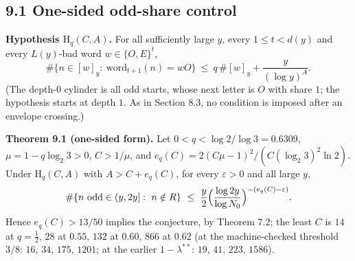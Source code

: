 \documentclass[11pt,a4paper]{article}
\begin{document}
\subsection{9.1 One-sided odd-share
control}\label{one-sided-odd-share-control}

\textbf{Hypothesis \(\mathrm H_q(C,A)\).} For all sufficiently large
\(y\), every \(1\le t<d(y)\) and every \(L(y)\)-bad word
\(w\in\{O,E\}^t\), \[
\#\{n\in[w]_y:\ \mathrm{word}_{t+1}(n)=wO\}\ \le\ q\,\#[w]_y+\frac{y}{(\log y)^{A}} .
\] (The depth-\(0\) cylinder is all odd starts, whose next letter is
\(O\) with share \(1\); the hypothesis starts at depth \(1\). As in
Section 8.3, no condition is imposed after an envelope crossing.)

\textbf{Theorem 9.1 (one-sided form).} Let \(0<q<\log 2/\log 3=0.6309\),
\(\mu=1-q\log_2 3>0\), \(C>1/\mu\), and
\(e_q(C)=2(C\mu-1)^2/(C(\log_2 3)^2\ln 2)\). Under \(\mathrm H_q(C,A)\)
with \(A>C+e_q(C)\), for every \(\varepsilon>0\) and all large \(y\), \[
\#\{n\ \text{odd}\in(y,2y]:\ n\notin R\}\ \le\ \frac y2\Bigl(\frac{\log 2y}{\log N_0}\Bigr)^{-(e_q(C)-\varepsilon)} .
\] Hence \(e_q(C)>13/50\) implies the conjecture, by Theorem 7.2; the
least \(C\) is \(14\) at \(q=\tfrac12\), \(28\) at \(0.55\), \(132\) at
\(0.60\), \(866\) at \(0.62\) (at the machine-checked threshold \(3/8\):
\(16\), \(34\), \(175\), \(1201\); at the earlier \(1-\lambda^{**}\):
\(19\), \(41\), \(223\), \(1586\)).
\end{document}
